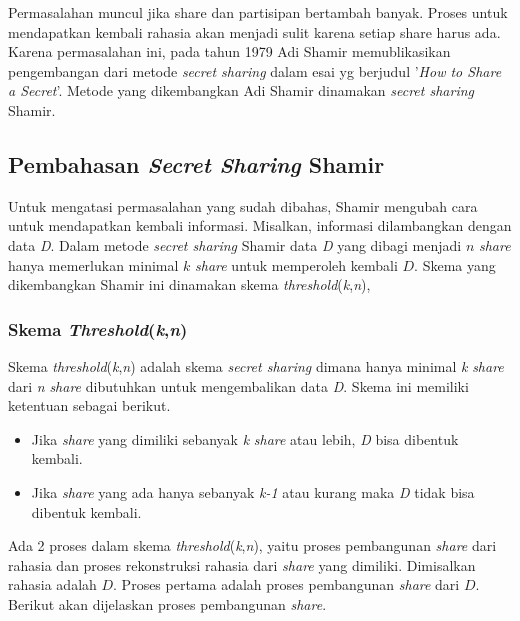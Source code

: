 Permasalahan muncul jika share dan partisipan bertambah banyak. Proses untuk mendapatkan kembali rahasia akan menjadi sulit karena setiap share harus ada. Karena permasalahan ini, pada tahun 1979 Adi Shamir memublikasikan pengembangan dari metode \textit{secret sharing} dalam esai yg berjudul '\textit{How to Share a Secret}'\cite{shamir1979share}. Metode yang dikembangkan Adi Shamir dinamakan \textit{secret sharing} Shamir.

\subsection{Pembahasan \textit{Secret Sharing} Shamir}

Untuk mengatasi permasalahan yang sudah dibahas, Shamir mengubah cara untuk mendapatkan kembali informasi. Misalkan, informasi dilambangkan dengan data \textit{D}. Dalam metode \textit{secret sharing} Shamir data \textit{D} yang dibagi menjadi \begin{math}n\end{math} \textit{share} hanya memerlukan minimal \begin{math}k\end{math} \textit{share} untuk memperoleh kembali \begin{math}D\end{math}. Skema yang dikembangkan Shamir ini dinamakan skema \textit{threshold}(\textit{k},\textit{n}),

\subsubsection{Skema \textit{Threshold}(\textit{k},\textit{n})}

Skema \textit{threshold}(\textit{k},\textit{n}) adalah skema \textit{secret sharing} dimana hanya minimal \textit{k} \textit{share} dari \textit{n} \textit{share} dibutuhkan untuk mengembalikan data \textit{D}. Skema ini memiliki ketentuan sebagai berikut\cite{shamir1979share}.

\begin{itemize}
	\item Jika \textit{share} yang dimiliki sebanyak \textit{k} \textit{share} atau lebih, \textit{D} bisa dibentuk kembali.
	\item Jika \textit{share} yang ada hanya sebanyak \textit{k-1} atau kurang maka \textit{D} tidak bisa dibentuk kembali.
\end{itemize}

Ada 2 proses dalam skema \textit{threshold}(\textit{k},\textit{n}), yaitu proses pembangunan \textit{share} dari rahasia dan proses rekonstruksi rahasia dari \textit{share} yang dimiliki. Dimisalkan rahasia adalah \begin{math}D\end{math}. Proses pertama adalah proses pembangunan \textit{share} dari \begin{math}D\end{math}. Berikut akan dijelaskan proses pembangunan \textit{share}.

